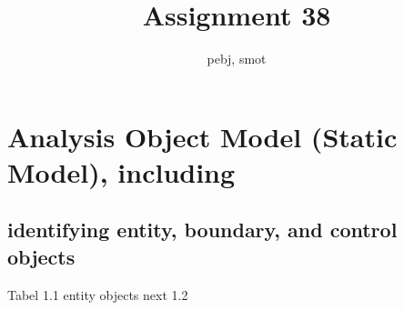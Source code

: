 \documentclass{article}
\begin{document}
	\title{Assignment 38}
	\author{pebj, smot}
	\maketitle
		\pagebreak{}

\section{Analysis Object Model (Static Model), including}
\subsection{identifying entity, boundary, and control objects}

\hfill \break Tabel 1.1 entity objects next 1.2\\
\end{document}

